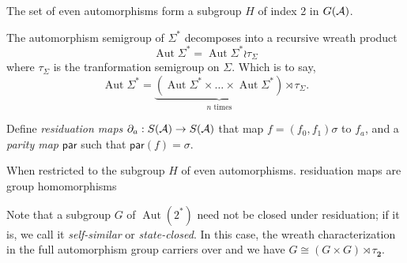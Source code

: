 \documentclass[11pt, titlepage]{article}
\begin{document}
The set of even automorphisms form a subgroup $H$ of index 2 in
$G(\mathcal{A})$.

The automorphism semigroup of $\Sigma^*$ decomposes into a recursive
wreath product
\[
  \operatorname{Aut}\Sigma^* = \operatorname{Aut}\Sigma^* \wr
  \tau_\Sigma
\]
where $\tau_\Sigma$ is the tranformation semigroup on $\Sigma$. Which
is to say,
\[
  \operatorname{Aut}\Sigma^* =
  \underbrace{(\operatorname{Aut}\Sigma^* \times \ldots \times
    \operatorname{Aut}\Sigma^* )}_\text{$n$ times} \rtimes
  \tau_\Sigma.
\]

\begin{definition}
  Define \emph{residuation maps}
  $\partial_a : S(\mathcal{A}) \rightarrow S(\mathcal{A})$ that map
  $f = (f_0, f_1)\sigma$ to $f_a$, and a \emph{parity map}
  $\textsf{par}$ such that $\textsf{par}(f) = \sigma$.
\end{definition}

When restricted to the subgroup $H$ of even automorphisms.
residuation maps are group homomorphisms

Note that a subgroup $G$ of $\operatorname{Aut}(2^*)$ need not be
closed under residuation; if it is, we call it \emph{self-similar} or
\emph{state-closed}. In this case, the wreath characterization in the
full automorphism group carriers over and we have
$G \cong (G \times G) \rtimes \tau_{\textbf{2}}$.



\end{document}
